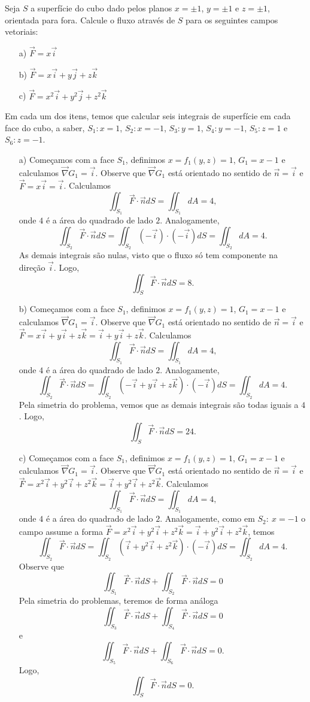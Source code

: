 \begin{exeresol} Seja $S$ a superfície do cubo dado pelos planos $x=\pm 1$, $y=\pm 1$ e $z=\pm 1$, orientada para fora. Calcule o fluxo através de $S$ para os seguintes campos vetoriais:
\begin{itemize}
 \item[a)]$\vec{F}=x\vec{i}$
 \item[b)]$\vec{F}=x\vec{i}+y\vec{j}+z\vec{k}$
 \item[c)]$\vec{F}=x^2\vec{i}+y^2\vec{j}+z^2\vec{k}$
 \end{itemize}
\end{exeresol}
\begin{resol}
Em cada um dos itens, temos que calcular seis integrais de superfície em cada face  do cubo, a saber, $S_1:x=1$, $S_2:x=-1$, $S_3:y=1$, $S_4:y=-1$, $S_5:z=1$ e $S_6:z=-1$. 
\begin{itemize}
 \item[a)] Começamos com a face $S_1$, definimos $x=f_1(y,z)=1$, $G_1=x-1$ e calculamos $\vec{\nabla}G_1=\vec{i}$. Observe que $\vec{\nabla}G_1$ está orientado no sentido de $\vec{n}=\vec{i}$ e $\vec{F}=x\vec{i}=\vec{i}$. Calculamos
 $$
 \iint_{S_1}\vec{F}\cdot \vec{n}dS= \iint_{S_1}dA=4,
 $$
 onde $4$ é a área do quadrado de lado $2$. Analogamente,
$$
 \iint_{S_2}\vec{F}\cdot \vec{n}dS= \iint_{S_2}(-\vec{i})\cdot (-\vec{i})dS=\iint_{S_2}dA=4.
 $$
 As demais integrais são nulas, visto que o fluxo só tem componente na direção $\vec{i}$. Logo,
 $$
 \iint_{S}\vec{F}\cdot \vec{n}dS= 8.
 $$
  \item[b)] Começamos com a face $S_1$, definimos $x=f_1(y,z)=1$, $G_1=x-1$ e calculamos $\vec{\nabla}G_1=\vec{i}$. Observe que $\vec{\nabla}G_1$ está orientado no sentido de $\vec{n}=\vec{i}$ e $\vec{F}=x\vec{i}+y\vec{i}+z\vec{k}=\vec{i}+y\vec{i}+z\vec{k}$. Calculamos
 $$
 \iint_{S_1}\vec{F}\cdot \vec{n}dS= \iint_{S_1}dA=4,
 $$
 onde $4$ é a área do quadrado de lado $2$. Analogamente,
$$
 \iint_{S_2}\vec{F}\cdot \vec{n}dS= \iint_{S_2}(-\vec{i}+y\vec{i}+z\vec{k})\cdot (-\vec{i})dS=\iint_{S_2}dA=4.
 $$
Pela simetria do problema, vemos que as demais integrais são todas iguais a $4$. Logo,
 $$
 \iint_{S}\vec{F}\cdot \vec{n}dS= 24.
 $$
  \item[c)] Começamos com a face $S_1$, definimos $x=f_1(y,z)=1$, $G_1=x-1$ e calculamos $\vec{\nabla}G_1=\vec{i}$. Observe que $\vec{\nabla}G_1$ está orientado no sentido de $\vec{n}=\vec{i}$ e $\vec{F}=x^2\vec{i}+y^2\vec{i}+z^2\vec{k}=\vec{i}+y^2\vec{i}+z^2\vec{k}$. Calculamos
 $$
 \iint_{S_1}\vec{F}\cdot \vec{n}dS= \iint_{S_1}dA=4,
 $$
 onde $4$ é a área do quadrado de lado $2$. Analogamente, como em $S_2:\ \!x=-1$ o campo assume a forma $\vec{F}=x^2\vec{i}+y^2\vec{i}+z^2\vec{k}=\vec{i}+y^2\vec{i}+z^2\vec{k}$, temos
$$
 \iint_{S_2}\vec{F}\cdot \vec{n}dS= \iint_{S_2}(\vec{i}+y^2\vec{i}+z^2\vec{k})\cdot (-\vec{i})dS=\iint_{S_2}dA=4.
 $$
 Observe que
 $$
  \iint_{S_1}\vec{F}\cdot \vec{n}dS+ \iint_{S_2}\vec{F}\cdot \vec{n}dS=0
 $$
Pela simetria do problemas, teremos de forma análoga
 $$
  \iint_{S_3}\vec{F}\cdot \vec{n}dS+ \iint_{S_4}\vec{F}\cdot \vec{n}dS=0
 $$
e
 $$
  \iint_{S_5}\vec{F}\cdot \vec{n}dS+ \iint_{S_6}\vec{F}\cdot \vec{n}dS=0.
 $$
 Logo,
 $$
 \iint_{S}\vec{F}\cdot \vec{n}dS= 0.
 $$
 

\end{itemize}
\end{resol}
